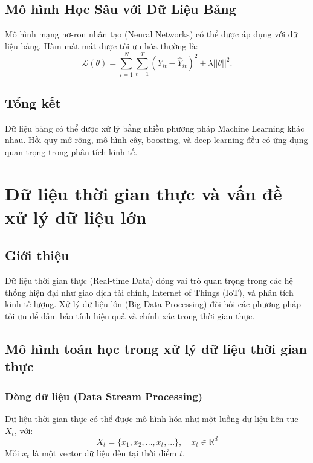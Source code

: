 \subsection{Mô hình Học Sâu với Dữ Liệu Bảng}
Mô hình mạng nơ-ron nhân tạo (Neural Networks) có thể được áp dụng với dữ liệu bảng. Hàm mất mát được tối ưu hóa thường là:
\begin{equation}
\mathcal{L}(\theta) = \sum_{i=1}^{N} \sum_{t=1}^{T} (Y_{it} - \hat{Y}_{it})^2 + \lambda ||\theta||^2.
\end{equation}

\subsection{Tổng kết}
Dữ liệu bảng có thể được xử lý bằng nhiều phương pháp Machine Learning khác nhau. Hồi quy mở rộng, mô hình cây, boosting, và deep learning đều có ứng dụng quan trọng trong phân tích kinh tế.






\section{Dữ liệu thời gian thực và vấn đề xử lý dữ liệu lớn}
\subsection{Giới thiệu}
Dữ liệu thời gian thực (Real-time Data) đóng vai trò quan trọng trong các hệ thống hiện đại như giao dịch tài chính, Internet of Things (IoT), và phân tích kinh tế lượng. Xử lý dữ liệu lớn (Big Data Processing) đòi hỏi các phương pháp tối ưu để đảm bảo tính hiệu quả và chính xác trong thời gian thực.

\subsection{Mô hình toán học trong xử lý dữ liệu thời gian thực}
\subsubsection{Dòng dữ liệu (Data Stream Processing)}
Dữ liệu thời gian thực có thể được mô hình hóa như một luồng dữ liệu liên tục $X_t$, với:
\begin{equation}
    X_t = \{x_1, x_2, ..., x_t, ...\}, \quad x_t \in \mathbb{R}^d
\end{equation}
Mỗi $x_t$ là một vector dữ liệu đến tại thời điểm $t$.

